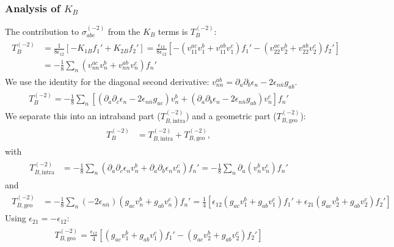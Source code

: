 \documentclass[twocolumn, prx, reprint, amsfonts, amsmath, amssymb, longbibliography, floatfix, aps]{revtex4-2}
\begin{document}
\subsubsection*{Analysis of \texorpdfstring{$K_B$}{KB}}
The contribution to $\sigma_{abc}^{(-2)}$ from the $K_B$ terms is $T_B^{(-2)}$:
\begin{align}
\begin{aligned}
T_B^{(-2)} &= \frac{1}{8\epsilon_{12}} [ -K_{1B} f_1' + K_{2B} f_2' ] = \frac{\epsilon_{12}}{8\epsilon_{12}} [ -(v_{11}^{ac} v_1^b + v_{11}^{ab} v_1^c) f_1' - (v_{22}^{ac} v_2^b + v_{22}^{ab} v_2^c) f_2' ] \\
&= -\frac{1}{8} \sum_n (v_{nn}^{ac} v_n^b + v_{nn}^{ab} v_n^c) f_n'
\end{aligned}
\end{align}
We use the identity for the diagonal second derivative: $v_{nn}^{ab} = \partial_a \partial_b \epsilon_n - 2 \epsilon_{n\bar{n}} g_{ab}$.
\begin{align}
\begin{aligned}
T_B^{(-2)} = -\frac{1}{8} \sum_n \left[ (\partial_a \partial_c \epsilon_n - 2 \epsilon_{n\bar{n}} g_{ac}) v_n^b + (\partial_a \partial_b \epsilon_n - 2 \epsilon_{n\bar{n}} g_{ab}) v_n^c \right] f_n'
\end{aligned}
\end{align}
We separate this into an intraband part ($T_{B, \text{intra}}^{(-2)}$) and a geometric part ($T_{B, \text{geo}}^{(-2)}$):
\begin{align}
\begin{aligned}
T_{B}^{(-2)} &= T_{B, \text{intra}}^{(-2)} + T_{B, \text{geo}}^{(-2)},
\end{aligned}
\end{align}
with
\begin{align}
\begin{aligned}
T_{B, \text{intra}}^{(-2)} &= -\frac{1}{8} \sum_n (\partial_a \partial_c \epsilon_n v_n^b + \partial_a \partial_b \epsilon_n v_n^c) f_n' = -\frac{1}{8} \sum_n \partial_a(v_n^b v_n^c) f_n'
\end{aligned}
\end{align}
and
\begin{align}
\begin{aligned}
T_{B, \text{geo}}^{(-2)} &= -\frac{1}{8} \sum_n (-2 \epsilon_{n\bar{n}}) (g_{ac} v_n^b + g_{ab} v_n^c) f_n' = \frac{1}{4} \left[ \epsilon_{12} (g_{ac} v_1^b + g_{ab} v_1^c) f_1' + \epsilon_{21} (g_{ac} v_2^b + g_{ab} v_2^c) f_2' \right]
\end{aligned}
\end{align}
Using $\epsilon_{21} = -\epsilon_{12}$:
\begin{align}
\begin{aligned}
T_{B, \text{geo}}^{(-2)} = \frac{\epsilon_{12}}{4} \left[ (g_{ac} v_1^b + g_{ab} v_1^c) f_1' - (g_{ac} v_2^b + g_{ab} v_2^c) f_2' \right]
\label{TB-2geo}
\end{aligned}
\end{align}
\end{document}
